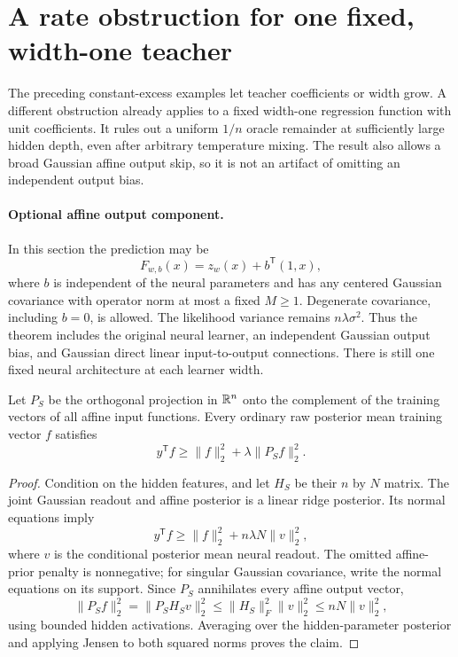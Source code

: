 \section{A rate obstruction for one fixed, width-one teacher}
\label{sec:simple-teacher-rate}
The preceding constant-excess examples let teacher coefficients or width grow. A different obstruction already applies to a fixed width-one regression function with unit coefficients. It rules out a uniform $1/n$ oracle remainder at sufficiently large hidden depth, even after arbitrary temperature mixing. The result also allows a broad Gaussian affine output skip, so it is not an artifact of omitting an independent output bias.

\paragraph{Optional affine output component.}
In this section the prediction may be
\[
 F_{w,b}(x)=z_w(x)+b^{\mathsf T}(1,x),
\]
where $b$ is independent of the neural parameters and has any centered Gaussian covariance with operator norm at most a fixed $M\ge1$. Degenerate covariance, including $b=0$, is allowed. The likelihood variance remains $n\lambda\sigma^2$. Thus the theorem includes the original neural learner, an independent Gaussian output bias, and Gaussian direct linear input-to-output connections. There is still one fixed neural architecture at each learner width.

\begin{lemma}
\label{lem:projected-sector}
Let $P_S$ be the orthogonal projection in $\mathbb R^n$ onto the complement of the training vectors of all affine input functions. Every ordinary raw posterior mean training vector $f$ satisfies
\[
 y^{\mathsf T}f\ge\|f\|_2^2+\lambda\|P_Sf\|_2^2.
\]
\end{lemma}
\begin{proof}
Condition on the hidden features, and let $H_S$ be their $n$ by $N$ matrix. The joint Gaussian readout and affine posterior is a linear ridge posterior. Its normal equations imply
\[
 y^{\mathsf T}f\ge\|f\|_2^2+n\lambda N\|v\|_2^2,
\]
where $v$ is the conditional posterior mean neural readout. The omitted affine-prior penalty is nonnegative; for singular Gaussian covariance, write the normal equations on its support. Since $P_S$ annihilates every affine output vector,
\[
 \|P_Sf\|_2^2=\|P_SH_Sv\|_2^2
 \le\|H_S\|_F^2\|v\|_2^2\le nN\|v\|_2^2,
\]
using bounded hidden activations. Averaging over the hidden-parameter posterior and applying Jensen to both squared norms proves the claim.
\end{proof}

